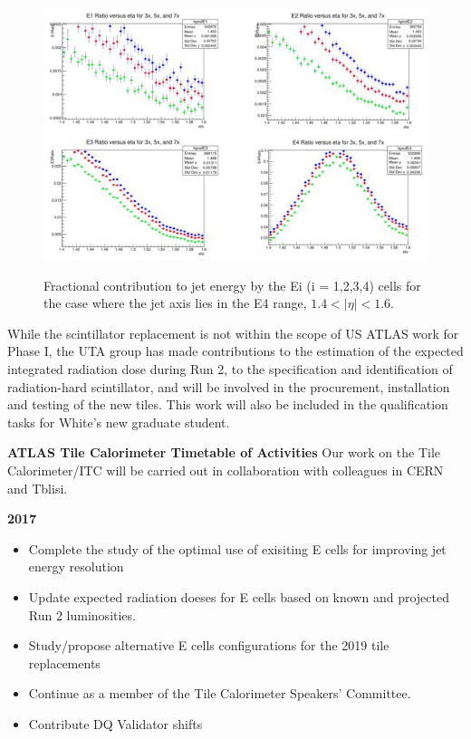 \begin{figure}[htb]
\centering

      \includegraphics[scale=0.6]{images/E4_Energy_ratios.jpg}
      \label{fig:E4_Energy_ratios}

\caption{Fractional contribution to jet energy by the Ei (i = 1,2,3,4) cells for the case where the jet axis 
lies in the E4 range, $1.4 < |\eta| < 1.6$.}
\end{figure}

While the scintillator replacement is not within the scope of US ATLAS work for Phase I, 
the UTA group has made contributions to the estimation of the expected integrated radiation dose during
Run 2, to the specification and identification of radiation-hard
scintillator, and will be involved in the procurement, installation and testing of the new
tiles. This work will also be included in the qualification tasks for White's new graduate student.

\textbf{ATLAS Tile Calorimeter Timetable of Activities}
Our work on the Tile Calorimeter/ITC will be carried out in collaboration with colleagues
in CERN and Tblisi.

\textbf{2017}
\begin{itemize}[noitemsep,nolistsep]
\item{Complete the study of the optimal use of exisiting E cells for improving jet energy resolution}
\item{Update expected radiation doeses for E cells based on known and projected Run 2 luminosities.}
\item{Study/propose alternative E cells configurations for the 2019 tile replacements}
\item{Continue as a member of the Tile Calorimeter Speakers' Committee.}
\item{Contribute DQ Validator shifts}
\end{itemize}

